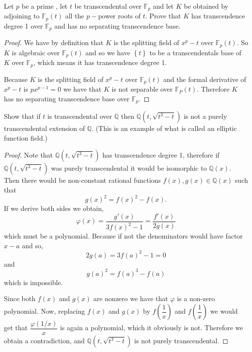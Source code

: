 \documentclass[11pt]{article}
\newenvironment{problem}[2][Problem\!]{\begin{tcolorbox}\begin{trivlist}
\item[\hskip \labelsep {\bfseries #1}\hskip \labelsep {\bfseries #2}]}{\end{trivlist}\end{tcolorbox}}
\newcommand{\qq}{\mathbb Q}   %
\newcommand{\ff}{\mathbb F}   %
\newcommand{\set}[1]{\left\{#1\right\}} %
\renewcommand{\phi}{\varphi}
\begin{document}
\vspace*{15pt}

\begin{problem} {14.9.5}
    Let $p$ be a prime , let $t$ be transcendental over $\ff_p$ and let $K$ be obtained by adjoining to $\ff_p(t)$ all the $p-$power roots of $t$. Prove that $K$ has transcendence degree 1 over $\ff_p$ and has no separating transcendence base. 
\end{problem}
\begin{proof}
    We have by definition that $K$ is the splitting field of $x^{p} - t$ over $\ff_p(t)$. So $K$ is algebraic over $\ff_p(t)$ and so we have $\set{t}$ to be a transcendentals base of $K$ over $\ff_p$, which means it has transcendence degree 1. 

    Because $K$ is the splitting field of $x^{p}- t$ over $\ff_p(t)$ and the formal derivative of $x^{p} - t$ is $px^{p-1} = 0$ we have that $K$ is not separable over $\ff_P(t)$. Therefore $K$ has no separating transcendence base over $\ff_p$. 
\end{proof}

\vspace*{15pt}

\begin{problem} {14.9.6}
    Show that if $t$ is transcendental over $\qq$ then $\qq(t, \sqrt{t^{3} -t})$ is not a purely transcendental extension of $\qq$. (This is an example of what is called an elliptic function field.)
\end{problem}
\begin{proof}
    Note that $\qq(t,\sqrt{t^{3}-t})$ has transcendence degree 1, therefore if $\qq(t,\sqrt{t^{3}-t})$ was purely transcendental it would be isomorphic to $\qq(x)$. Then there would be non-constant rational functions $f(x),g(x)\in \qq(x)$ such that 
    \[g(x)^{2} = f(x)^{2} -f(x).\]
    If we derive both sides we obtain,
    \[\phi(x) = \dfrac{g'(x)}{3f(x)^{2} - 1} = \dfrac{f'(x)}{2g(x)}\]
    which must be a polynomial. Because if not the denominators would have  factor $x-a$ and so,
    \[2g(a) = 3f(a)^{2} -1 = 0\]
    and 
    \[g(a)^{2} = f(a)^{3} - f(a)\]
    which is impossible. 

    Since both $f(x)$ and $g(x)$ are nonzero we have that $\phi$ is a non-zero polynomial. Now, replacing $f(x)$ and $g(x)$ by $f(\dfrac{1}{x})$ and $f(\dfrac{1}{x})$ we would get that $\dfrac{\phi(1/x)}{x}$ is again a polynomial, which it obviously is not. Therefore we obtain a contradiction, and $\qq(t,\sqrt{t^{3}-t})$ is not purely transcendental.
\end{proof}
\end{document}
